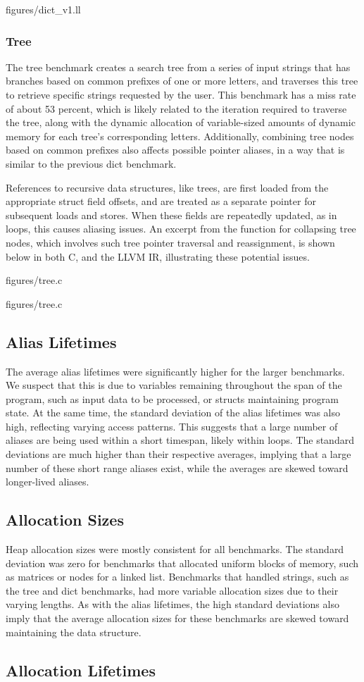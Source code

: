  {figures/dict\_v1.ll}

\subsubsection{Tree}
The tree benchmark creates a search tree from a series of input strings that has branches based on common prefixes of one or more letters, and traverses this tree to retrieve specific strings requested by the user. This benchmark has a miss rate of about 53 percent, which is likely related to the iteration required to traverse the tree, along with the dynamic allocation of variable-sized amounts of dynamic memory for each tree's corresponding letters. Additionally, combining tree nodes based on common prefixes also affects possible pointer aliases, in a way that is similar to the previous dict benchmark.

References to recursive data structures, like trees, are first loaded from the appropriate struct field offsets, and are treated as a separate pointer for subsequent loads and stores. When these fields are repeatedly updated, as in loops, this causes aliasing issues. An excerpt from the function for collapsing tree nodes, which involves such tree pointer traversal and reassignment, is shown below in both C, and the LLVM IR, illustrating these potential issues.

 {figures/tree.c}

 {figures/tree.c}

\subsection{Alias Lifetimes}
The average alias lifetimes were significantly higher for the larger benchmarks. We suspect that this is due to variables remaining throughout the span of the program, such as input data to be processed, or structs maintaining program state. At the same time, the standard deviation of the alias lifetimes was also high, reflecting varying access patterns. This suggests that a large number of aliases are being used within a short timespan, likely within loops. The standard deviations are much higher than their respective averages, implying that a large number of these short range aliases exist, while the averages are skewed toward longer-lived aliases.

\subsection{Allocation Sizes}
Heap allocation sizes were mostly consistent for all benchmarks. The standard deviation was zero for benchmarks that allocated uniform blocks of memory, such as matrices or nodes for a linked list. Benchmarks that handled strings, such as the tree and dict benchmarks, had more variable allocation sizes due to their varying lengths. As with the alias lifetimes, the high standard deviations also imply that the average allocation sizes for these benchmarks are skewed toward maintaining the data structure.

\subsection{Allocation Lifetimes}
